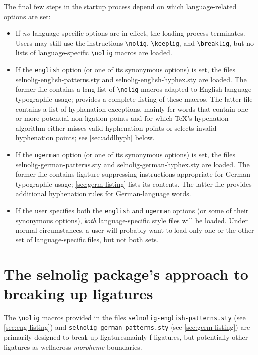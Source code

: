 \documentclass[12pt]{article}
\newcommand{\pkg}[1]{\textsf{#1}}
\newcommand{\opt}[1]{\texttt{#1}}
\newcommand{\cmmd}[1]{\texttt{\textbackslash #1}}
\begin{document}
The final few steps in the startup process depend on which language-related options are set:
\begin{itemize}
\item If \emph{no} language-specific options are in effect, the loading process terminates. Users may still use the instructions \cmmd{nolig}, \cmmd{keeplig}, and \cmmd{breaklig}, but no lists of language-specific \cmmd{nolig} macros are loaded.

\item If the \opt{english} option (or one of its synonymous options) is set, the files \pkg{selnolig-english-patterns.sty} and \pkg{selnolig-english-hyphex.sty} are loaded. The former file contains a long list of \cmmd{nolig} macros adapted to English language typographic usage;  provides a complete listing of these macros. The latter file contains a list of hyphenation exceptions, mainly for words that contain one or more potential non-ligation points and for which \TeX's hypenation algorithm either misses valid hyphenation points or selects invalid hyphenation points; see \cref{sec:addlhyph} below.

\item If the \opt{ngerman} option (or one of its synonymous options) is set, the files \pkg{selnolig-german-patterns.sty} and \pkg{selnolig-german-hyphex.sty} are loaded. The former file contains ligature-suppressing instructions appropriate for German typographic usage; \cref{sec:germ-listing} lists its contents. The latter file provides additional hyphenation rules for German-language words.

\item If the user specifies both the \opt{english} and \opt{ngerman} options (or some of their synonymous options), \emph{both} language-specific style files will be loaded. Under normal circumstances, a user will probably want to load only one or the other set of language-specific files, but not both sets.
\end{itemize}



\section[The selnolig package's approach to breaking up ligatures]{The \pkg{selnolig} package's approach to breaking up ligatures}

The \cmmd{nolig} macros provided in the files \opt{selnolig-english-patterns.sty} (see \cref{sec:eng-listing}) and \opt{selnolig-german-patterns.sty} (see \cref{sec:germ-listing}) are primarily designed to break up ligatures\textemdash mainly f-ligatures, but potentially other ligatures as well\textemdash across \emph{morpheme} boundaries. 
\end{document}
